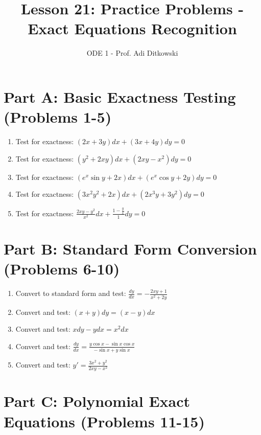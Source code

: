 \documentclass[12pt]{article}
\title{Lesson 21: Practice Problems - Exact Equations Recognition}
\author{ODE 1 - Prof. Adi Ditkowski}
\date{}
\begin{document}
\maketitle

\section*{Part A: Basic Exactness Testing (Problems 1-5)}

\begin{enumerate}
\item Test for exactness: $(2x + 3y)dx + (3x + 4y)dy = 0$

\item Test for exactness: $(y^2 + 2xy)dx + (2xy - x^2)dy = 0$

\item Test for exactness: $(e^x\sin y + 2x)dx + (e^x\cos y + 2y)dy = 0$

\item Test for exactness: $(3x^2y^2 + 2x)dx + (2x^3y + 3y^2)dy = 0$

\item Test for exactness: $\frac{2xy - y^2}{x^2}dx + \frac{1 - \frac{y}{x}}{1}dy = 0$
\end{enumerate}

\section*{Part B: Standard Form Conversion (Problems 6-10)}

\begin{enumerate}[start=6]
\item Convert to standard form and test: $\frac{dy}{dx} = -\frac{2xy + 1}{x^2 + 2y}$

\item Convert and test: $(x + y)dy = (x - y)dx$

\item Convert and test: $x dy - y dx = x^2 dx$

\item Convert and test: $\frac{dy}{dx} = \frac{y\cos x - \sin x \cos x}{-\sin x + y\sin x}$

\item Convert and test: $y' = \frac{3x^2 + y^2}{2xy - x^2}$
\end{enumerate}

\section*{Part C: Polynomial Exact Equations (Problems 11-15)}
\end{document}
